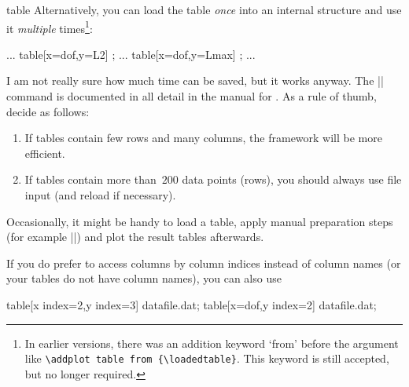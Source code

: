 {\begin{addplotoperation}[]{table}{}
Alternatively, you can load the table \emph{once} into an internal structure and use it \emph{multiple} times\footnote{In earlier versions, there was an addition keyword `from' before the argument like \texttt{\textbackslash addplot table from \{\textbackslash loadedtable\}}. This keyword is still accepted, but no longer required.}:
\begin{codeexample}
\loadedtable %
...
\addplot table[x=dof,y=L2] {\loadedtable};
...
\addplot table[x=dof,y=Lmax] {\loadedtable};
...
\end{codeexample}
I am not really sure how much time can be saved, but it works anyway. The |\pgfplotstableread| command is documented in all detail in the manual for \PGFPlotstable. As a rule of thumb, decide as follows:
\begin{enumerate}
	\item If tables contain few rows and many columns, the  framework will be more efficient.
	\item If tables contain more than~$200$ data points (rows), you should always use file input (and reload if necessary).
\end{enumerate}
Occasionally, it might be handy to load a table, apply manual preparation steps (for example |\pgfplotstabletranspose|) and plot the result tables afterwards.

If you do prefer to access columns by column indices instead of column names (or your tables do not have column names), you can also use
\begin{codeexample}
\addplot table[x index=2,y index=3] {datafile.dat};
\addplot table[x=dof,y index=2] {datafile.dat};
\end{codeexample}


\end{addplotoperation}}
